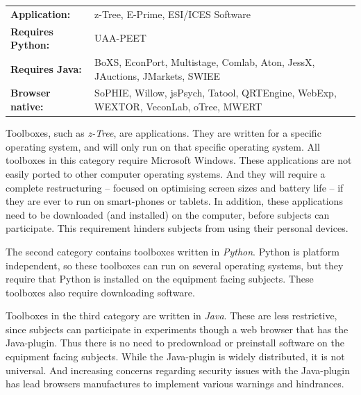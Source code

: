 \documentclass[preprint, 12pt]{elsarticle}
\begin{document}
\begin{table}[h!]
\begin{tabular}{ l p{} }
{\bf Application:} & z-Tree, E-Prime, ESI/ICES Software \\
{\bf Requires Python:} & UAA-PEET \\
{\bf Requires Java:} & BoXS, EconPort, Multistage, Comlab, Aton, JessX, JAuctions, JMarkets, SWIEE \\
{\bf Browser native:} & SoPHIE, Willow, jsPsych, Tatool, QRTEngine, WebExp, WEXTOR, VeconLab, oTree, MWERT \\
\end{tabular}
\end{table}

Toolboxes, such as \emph{z-Tree}, are applications. They are written for a specific operating system, and will only run on that specific operating system. All toolboxes in this category require Microsoft Windows. These applications are not easily ported to other computer operating systems. And they will require a complete restructuring -- focused on optimising screen sizes and battery life -- if they are ever to run on smart-phones or tablets. In addition, these applications need to be downloaded (and installed) on the computer, before subjects can participate. This requirement hinders subjects from using their personal devices.

The second category contains toolboxes written in \emph{Python}. Python is platform independent, so these toolboxes can run on several operating systems, but they require that Python is installed on the equipment facing subjects\footnotemark[2]. These toolboxes also require downloading software.


Toolboxes in the third category are written in \emph{Java}. These are less restrictive, since subjects can participate in experiments though a web browser that has the Java-plugin. Thus there is no need to predownload or preinstall software on the equipment facing subjects. While the Java-plugin is widely distributed, it is not universal\footnotemark[3]. And increasing concerns regarding security issues with the Java-plugin has lead browsers manufactures to implement various warnings and hindrances\footnotemark[4]. 

 
\end{document}
